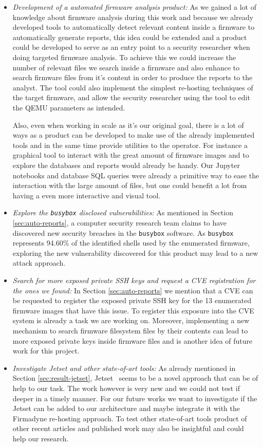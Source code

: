 \begin{itemize}
    \item \textit{Development of a automated firmware analysis product:} As we gained a lot of knowledge about firmware analysis during this work and because we already developed tools to automatically detect relevant content inside a firmware to automatically generate reports, this idea could be extended and a product could be developed to serve as an entry point to a security researcher when doing targeted firmware analysis. To achieve this we could increase the number of relevant files we search inside a firmware and also enhance to search firmware files from it's content in order to produce the reports to the analyst. The tool could also implement the simplest re-hosting techniques of the target firmware, and allow the security researcher using the tool to edit the QEMU parameters as intended.
    
    Also, even when working in scale as it's our original goal, there is a lot of ways as a product can be developed to make use of the already implemented tools and in the same time provide utilities to the operator. For instance a graphical tool to interact with the great amount of firmware images and to explore the databases and reports would already be handy. Our Jupyter notebooks and database SQL queries were already a primitive way to ease the interaction with the large amount of files, but one could benefit a lot from having a even more interactive and visual tool.
    
    \item \textit{Explore the {\tt busybox} disclosed vulnerabilities:} As mentioned in Section \ref{sec:auto-reports}, a computer security research team claims to have discovered new security breaches in the {\tt busybox} software. As {\tt busybox} represents 94.60\% of the identified shells used by the enumerated firmware, exploring the new vulnerability discovered for this product may lead to a new attack approach.
    
    \item \textit{Search for more exposed private SSH keys and request a CVE registration for the ones we found:} In Section \ref{sec:auto-reports} we mention that a CVE can be requested to register the exposed private SSH key for the 13 enumerated firmware images that have this issue. To register this exposure into the CVE system is already a task we are working on. Moreover, implementing a new mechanism to search firmware filesystem files by their contents can lead to more exposed private keys inside firmware files and is another idea of future work for this project.
    
    \item \textit{Investigate Jetset and other state-of-art tools:} As already mentioned in Section \ref{sec:result-jetset}, Jetset~\cite{jetset} seems to be a novel approach that can be of help to our task. The work however is very new and we could not test if deeper in a timely manner. For our future works we want to investigate if the Jetset can be added to our architecture and maybe integrate it with the Firmadyne re-hosting approach. To test other state-of-art tools product of other recent articles and published work may also be insightful and could help our research.
\end{itemize}
